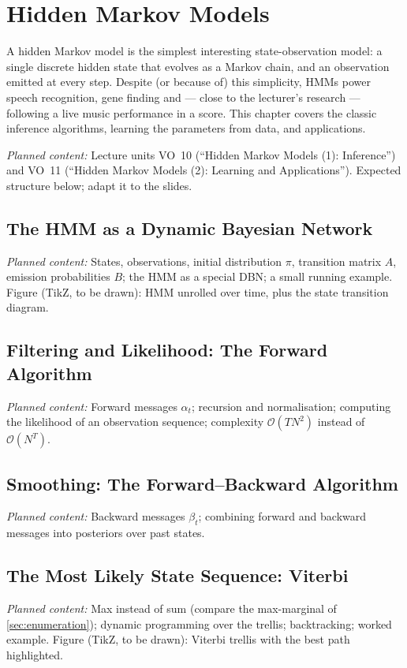\documentclass[11pt, oneside]{book}
\newcommand{\bigO}[1]{\mathcal{O}\!\left(#1\right)}
\newcommand{\planned}[1]{%
  \par{\small\color{gray!70!black}\textit{Planned content:} #1}\par}
\let\originalsection\section
\renewcommand{\section}{\Needspace{7\baselineskip}\originalsection}
\begin{document}
\chapter{Hidden Markov Models}
\label{ch:hmm}

A hidden Markov model is the simplest interesting state-observation model: a
single discrete hidden state that evolves as a Markov chain, and an
observation emitted at every step. Despite (or because of) this simplicity,
HMMs power speech recognition, gene finding and --- close to the lecturer's
research --- following a live music performance in a score. This chapter
covers the classic inference algorithms, learning the parameters from data,
and applications.

\planned{Lecture units VO~10 (``Hidden Markov Models (1): Inference'') and
VO~11 (``Hidden Markov Models (2): Learning and Applications''). Expected
structure below; adapt it to the slides.}

\section{The HMM as a Dynamic Bayesian Network}
\planned{States, observations, initial distribution $\pi$, transition matrix
$A$, emission probabilities $B$; the HMM as a special DBN; a small running
example. Figure (TikZ, to be drawn): HMM unrolled over time, plus the state
transition diagram.}

\section{Filtering and Likelihood: The Forward Algorithm}
\planned{Forward messages $\alpha_t$; recursion and normalisation; computing
the likelihood of an observation sequence; complexity $\bigO{T N^2}$
instead of $\bigO{N^T}$.}

\section{Smoothing: The Forward--Backward Algorithm}
\planned{Backward messages $\beta_t$; combining forward and backward messages
into posteriors over past states.}

\section{The Most Likely State Sequence: Viterbi}
\planned{Max instead of sum (compare the max-marginal of
\cref{sec:enumeration}); dynamic programming over the trellis; backtracking;
worked example. Figure (TikZ, to be drawn): Viterbi trellis with the best path
highlighted.}
\end{document}
